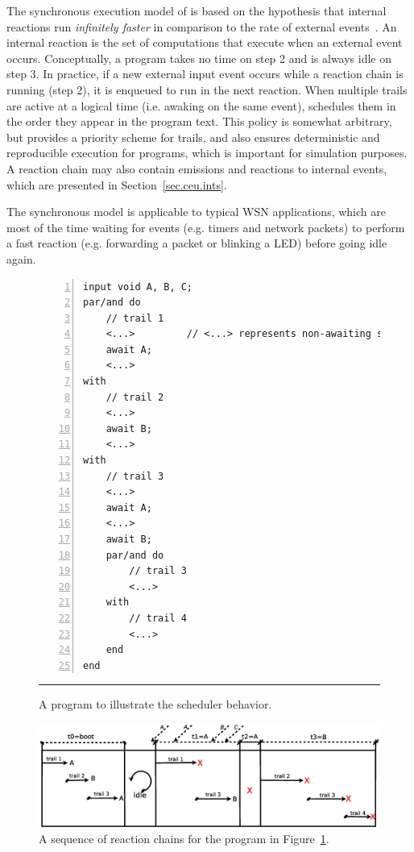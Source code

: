 The synchronous execution model of \CEU is based on the hypothesis that 
internal reactions run \emph{infinitely faster} in comparison to the rate of 
external events~\cite{rp.hypothesis}.
An internal reaction is the set of computations that execute when an external 
event occurs.
Conceptually, a program takes no time on step 2 and is always idle on step 3.
In practice, if a new external input event occurs while a reaction chain is 
running (step 2), it is enqueued to run in the next reaction.
%
%
When multiple trails are active at a logical time (i.e. awaking on the same 
event), \CEU schedules them in the order they appear in the program text.
This policy is somewhat arbitrary, but provides a priority scheme for trails, 
and also ensures deterministic and reproducible execution for programs, which 
is important for simulation purposes.
A reaction chain may also contain emissions and reactions to internal events, 
which are presented in Section~\ref{sec.ceu.ints}.

The synchronous model is applicable to typical WSN applications, which are most 
of the time waiting for events (e.g. timers and network packets) to perform a 
fast reaction (e.g. forwarding a packet or blinking a LED) before going idle 
again.

\begin{figure}[h]
\begin{lstlisting}[numbers=left,xleftmargin=2em]
input void A, B, C;
par/and do
    // trail 1
    <...>         // <...> represents non-awaiting statements
    await A;
    <...>
with
    // trail 2
    <...>
    await B;
    <...>
with
    // trail 3
    <...>
    await A;
    <...>
    await B;
    par/and do
        // trail 3
        <...>
    with
        // trail 4
        <...>
    end
end
\end{lstlisting}
%
\rule{14cm}{0.37pt}
\caption{ A \CEU program to illustrate the scheduler behavior.
{\small %
}%
\label{lst.reaction}
}
\end{figure}

\begin{figure}[h]
\centering
\includegraphics[scale=0.45]{reaction}
\caption{ A sequence of reaction chains for the program in 
Figure~\ref{lst.reaction}.
\label{fig.reaction}
}
\end{figure}

